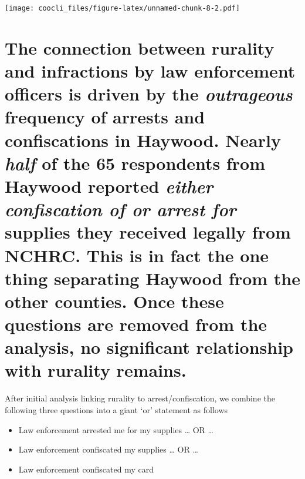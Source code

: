 \documentclass[
]{book}
\providecommand{\tightlist}{%
  \setlength{\itemsep}{0pt}\setlength{\parskip}{0pt}}
\begin{document}
\texttt{[image: coocli\_files/figure-latex/unnamed-chunk-8-2.pdf]}

\hypertarget{the-connection-between-rurality-and-infractions-by-law-enforcement-officers-is-driven-by-the-outrageous-frequency-of-arrests-and-confiscations-in-haywood.-nearly-half-of-the-65-respondents-from-haywood-reported-either-confiscation-of-or-arrest-for-supplies-they-received-legally-from-nchrc.-this-is-in-fact-the-one-thing-separating-haywood-from-the-other-counties.-once-these-questions-are-removed-from-the-analysis-no-significant-relationship-with-rurality-remains.}{%
\section{\texorpdfstring{The connection between rurality and infractions by law enforcement officers is driven by the \emph{outrageous} frequency of arrests and confiscations in Haywood. Nearly \emph{half} of the 65 respondents from Haywood reported \emph{either \emph{confiscation of} or \emph{arrest for}} supplies they received legally from NCHRC. This is in fact the one thing separating Haywood from the other counties. Once these questions are removed from the analysis, no significant relationship with rurality remains.}{The connection between rurality and infractions by law enforcement officers is driven by the outrageous frequency of arrests and confiscations in Haywood. Nearly half of the 65 respondents from Haywood reported either confiscation of or arrest for supplies they received legally from NCHRC. This is in fact the one thing separating Haywood from the other counties. Once these questions are removed from the analysis, no significant relationship with rurality remains.}}\label{the-connection-between-rurality-and-infractions-by-law-enforcement-officers-is-driven-by-the-outrageous-frequency-of-arrests-and-confiscations-in-haywood.-nearly-half-of-the-65-respondents-from-haywood-reported-either-confiscation-of-or-arrest-for-supplies-they-received-legally-from-nchrc.-this-is-in-fact-the-one-thing-separating-haywood-from-the-other-counties.-once-these-questions-are-removed-from-the-analysis-no-significant-relationship-with-rurality-remains.}}

After initial analysis linking rurality to arrest/confiscation, we combine the following three questions into a giant `or' statement as follows

\begin{itemize}
\tightlist
\item
  Law enforcement arrested me for my supplies \ldots{} OR \ldots{}
\item
  Law enforcement confiscated my supplies \ldots{} OR \ldots{}
\item
  Law enforcement confiscated my card
\end{itemize}
\end{document}
